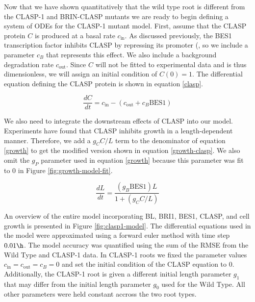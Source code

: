 Now that we have shown quantitatively that the wild type root is different from the CLASP-1 and BRIN-CLASP mutants we are ready to begin defining a system of ODEs for the CLASP-1 mutant model. First, assume that the CLASP protein $C$ is produced at a basal rate $c_{\text{in}}$. As discussed previously, the BES1 transcription factor inhibits CLASP by repressing its promoter (\cite{ruan2018}, so we include a parameter $c_{B}$ that represents this effect. We also include a background degradation rate $c_{\text{out}}$. Since $C$ will not be fitted to experimental data and is thus dimensionless, we will assign an initial condition of $C(0) = 1$. The differential equation defining the CLASP protein is shown in equation \eqref{clasp}.

\begin{equation}
\label{clasp}
\frac{dC}{dt} = c_{\text{in}} - (c_{\text{out}} + c_{B}\text{BES1})
\end{equation}

We also need to integrate the downstream effects of CLASP into our model. Experiments have found that CLASP inhibits growth in a length-dependent manner. Therefore, we add a $g_{C}C / L$ term to the denominator of  equation \eqref{growth} to get the modified version shown in equation \eqref{growth-clasp}. We also omit the $g_{P}$ parameter used in equation \eqref{growth} because this parameter was fit to $0$ in Figure \ref{fig:growth-model-fit}.

\begin{equation}
\label{growth-clasp}
\frac{dL}{dt} = \frac{(g_{B}\text{BES1})L}{1 + (g_{C}C/L)}
\end{equation}

An overview of the entire model incorporating BL, BRI1, BES1, CLASP, and cell growth is presented in Figure \ref{fig:clasp1-model}. The differential equations used in the model were approximated using a forward euler method with time step $0.01\h$. The model accuracy was quantified using the sum of the RMSE from the Wild Type and CLASP-1 data. In CLASP-1 roots we fixed the parameter values $c_{\text{in}} = c_{\text{out}} = c_{B} = 0$ and set the initial condition of the CLASP equation to $0$. Additionally, the CLASP-1 root is given a different initial length parameter $g_{1}$ that may differ from the initial length parameter $g_{0}$ used for the Wild Type.  All other parameters were held constant accross the two root types.

